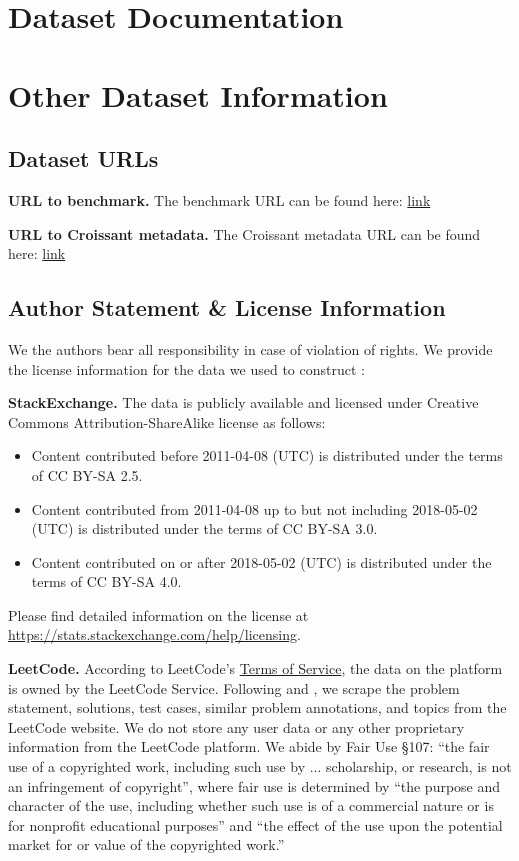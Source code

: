 
\section{Dataset Documentation}


\section{Other Dataset Information}
\subsection{Dataset URLs}
\textbf{URL to benchmark.} The benchmark URL can be found here: \href{https://huggingface.co/datasets/xlangai/BRIGHT}{link}

\textbf{URL to Croissant metadata.} The Croissant metadata URL can be found here: \href{https://huggingface.co/api/datasets/xlangai/BRIGHT/croissant}{link}

\subsection{Author Statement \& License Information}
 We the authors bear all responsibility in case of violation of rights. We provide the license information for the data we used to construct \ours{}:
 
 \textbf{StackExchange.} The data is publicly available and licensed under Creative Commons Attribution-ShareAlike license as follows:
\begin{itemize}
    \item Content contributed before 2011-04-08 (UTC) is distributed under the terms of CC BY-SA 2.5.
    \item Content contributed from 2011-04-08 up to but not including 2018-05-02 (UTC) is distributed under the terms of CC BY-SA 3.0.
    \item Content contributed on or after 2018-05-02 (UTC) is distributed under the terms of CC BY-SA 4.0.
\end{itemize}
Please find detailed information on the license at \url{https://stats.stackexchange.com/help/licensing}.

\textbf{LeetCode.} According to LeetCode's \href{https://leetcode.com/terms/}{Terms of Service}, the data on the platform is owned by the LeetCode Service. Following \cite{hendrycks2021measuring} and \cite{jain2024livecodebench}, we scrape the problem statement, solutions, test cases, similar problem annotations, and topics from the LeetCode website. We do not store any user data or any other proprietary information from the LeetCode platform. We abide by Fair Use §107: “the fair use of a copyrighted work, including such use by ... scholarship, or research, is not an infringement of copyright”, where fair use is determined by “the purpose and character of the use, including whether such use is of a commercial nature or is for nonprofit educational purposes” and “the effect of the use upon the potential market
for or value of the copyrighted work.”


